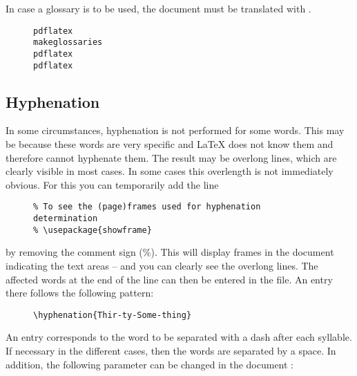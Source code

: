 In case a glossary is to be used, the document must be translated with
.

\begin{figure}[H]
    \small
    \centering
    \begin{BVerbatim}
pdflatex
makeglossaries
pdflatex
pdflatex
    \end{BVerbatim}
\end{figure}

\subsection{Hyphenation}

In some circumstances, hyphenation is not performed for some words. This may
be because these words are very specific and \LaTeX{} does not know them and
therefore cannot hyphenate them. The result may be overlong lines, which are
clearly visible in most cases. In some cases this overlength is not
immediately obvious. For this you can temporarily add the line

\begin{figure}[H]
    \small
    \centering
    \begin{BVerbatim}
    \end{BVerbatim}
\end{figure}

by removing the comment sign (\%). This will display frames in the document
indicating the text areas -- and you can clearly see the overlong lines. The
affected words at the end of the line can then be entered in the
 file. An entry there follows the
following pattern:

\begin{figure}[H]
    \small
    \centering
    \begin{BVerbatim}
\hyphenation{Thir-ty-Some-thing}
    \end{BVerbatim}
\end{figure}

An entry corresponds to the word to be separated with a dash after each
syllable. If necessary in the different cases, then the words are separated
by a space. In addition, the following parameter can be changed in the document
:

